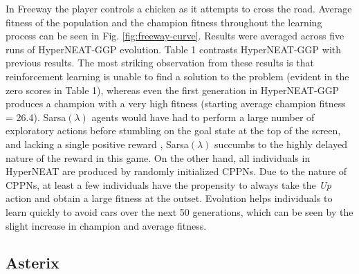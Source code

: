 \documentclass{sig-alternate}
\begin{document}
In Freeway the player controls a chicken as it attempts to cross the road. Average fitness of the population and the champion fitness throughout the learning process can be seen in Fig. \ref{fig:freeway-curve}. Results were averaged across five runs of HyperNEAT-GGP evolution.  Table 1 contrasts HyperNEAT-GGP with previous results. The most striking observation from these results is that reinforcement learning  is unable to find a solution to the problem (evident in the zero scores in Table 1), whereas even the first generation in HyperNEAT-GGP produces a champion with a very high fitness (starting average champion fitness = 26.4). Sarsa$(\lambda)$ agents would have had to perform a large number of exploratory actions before stumbling on the goal state at the top of the screen, and lacking a single positive reward , Sarsa$(\lambda)$ succumbs  to the highly delayed nature of the reward in this game. On the other hand, all individuals in HyperNEAT are produced by randomly initialized CPPNs. Due to the nature of CPPNs, at least a few individuals have the propensity to always take the \textit{Up} action and obtain a large fitness at the outset. Evolution helps individuals to learn quickly to avoid cars over the next 50 generations, which can be seen by the slight increase in champion and average fitness.

\subsection {Asterix}
\end{document}
